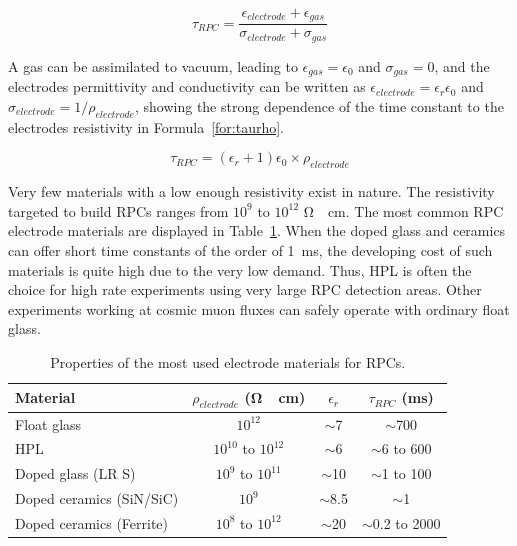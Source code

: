 	\begin{equation}
		\label{for:tau}
		\tau_{RPC} = \frac{\epsilon_{electrode}+\epsilon_{gas}}{\sigma_{electrode}+\sigma_{gas}}
	\end{equation}
	
	A gas can be assimilated to vacuum, leading to $\epsilon_{gas} = \epsilon_0$ and $\sigma_{gas} = 0$, and the electrodes permittivity and conductivity can be written as $\epsilon_{electrode} = \epsilon_r\epsilon_0$ and $\sigma_{electrode} = 1/\rho_{electrode}$, showing the strong dependence of the time constant to the electrodes resistivity in Formula~\ref{for:taurho}.
	
	\begin{equation}
		\label{for:taurho}
		\tau_{RPC} = (\epsilon_r + 1)\epsilon_0\times\rho_{electrode}
	\end{equation}
	
	Very few materials with a low enough resistivity exist in nature. The resistivity targeted to build RPCs ranges from $10^9$ to $10^{12}$ \si{\ohm\cdot cm}. The most common RPC electrode materials are displayed in Table~\ref{tab:tau}. When the doped glass and ceramics can offer short time constants of the order of \SI{1}{ms}, the developing cost of such materials is quite high due to the very low demand. Thus, \acf{HPL} is often the choice for high rate experiments using very large RPC detection areas. Other experiments working at cosmic muon fluxes can safely operate with ordinary float glass.
	
	\begin{table}[!h]
		\centering
		\begin{tabular}{|l|c|c|c|}
		\hline
		Material & $\rho_{electrode}$ (\si{\ohm\cdot cm}) & $\epsilon_r$ & $\tau_{RPC}$ (\si{ms})\\
		\hline
		Float glass & $10^{12}$ & $\sim$7 & $\sim$700\\
		\acl{HPL} & $10^{10}$ to $10^{12}$ & $\sim$6 & $\sim$6 to 600\\
		Doped glass (LR S) & $10^{9}$ to $10^{11}$ & $\sim$10 & $\sim$1 to 100\\
		Doped ceramics (SiN/SiC) & $10^{9}$ & $\sim$8.5 & $\sim$1\\
		Doped ceramics (Ferrite) & $10^{8}$ to $10^{12}$ & $\sim$20 & $\sim$0.2 to 2000\\
		\hline
		\end{tabular}
		\caption{\label{tab:tau} Properties of the most used electrode materials for RPCs.}
	\end{table}
	
